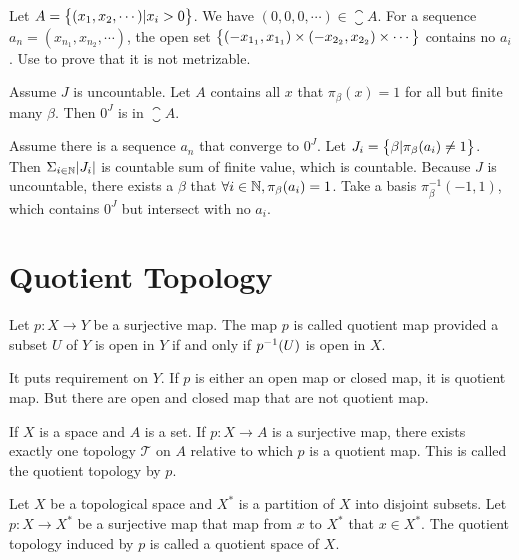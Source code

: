 \begin{example}
    Let $A = \set{(x_1, x_2, \cdots ) | x_i > 0}$. We have $(0,0,0, \cdots) \in \closure{A}$. For a sequence $a_n = (x_{n_1}, x_{n_2}, \cdots)$, the open set $\set{(- x_{1_1}, x_{1_1}) \times (- x_{2_2}, x_{2_2}) \times \cdots}$ contains no $a_i$. Use  to prove that it is not metrizable.
\end{example}


\begin{example}
    Assume $J$ is uncountable. Let $A$ contains all $x$ that $\pi_{\beta}(x) = 1$ for all but finite many $\beta$. Then $0^J$ is in $\closure{A}$.
    
    Assume there is a sequence $a_n$ that converge to $0^J$. Let $J_i = \set{\beta | \pi_\beta (a_i) \neq 1 }$. Then $\Sigma_{i\in \mathbb{N}} \abs{J_i}$ is countable sum of finite value, which is countable. Because $J$ is uncountable, there exists a $\beta$ that $\forall i \in \mathbb{N}, \pi_\beta (a_i) = 1$. Take a basis $\pi_{\beta}^{-1}(-1,1)$, which contains $0^J$ but intersect with no $a_i$.
\end{example}


\section{Quotient Topology}

\begin{definition}
    Let $p: X \rightarrow Y$ be a surjective map. The map $p$ is called quotient map provided a subset $U$ of $Y$ is open in $Y$ if and only if ${p}^{-1}(U)$ is open in $X$.
    
    It puts requirement on $Y$. If $p$ is either an open map or closed map, it is quotient map. But there are open and closed map that are not quotient map.
\end{definition}

\begin{definition}
    If $X$ is a space and $A$ is a set. If $p: X \rightarrow A$ is a surjective map, there exists exactly one topology $\mathcal{T}$ on $A$ relative to which $p$ is a quotient map. This is called the quotient topology by $p$.
\end{definition}

\begin{definition}
    Let $X$ be a topological space and $X^*$ is a partition of $X$ into disjoint subsets. Let $p:X \rightarrow X^*$ be a surjective map that map from $x$ to $X^*$ that $x \in X^*$. The quotient topology induced by $p$ is called a quotient space of $X$.
\end{definition}







